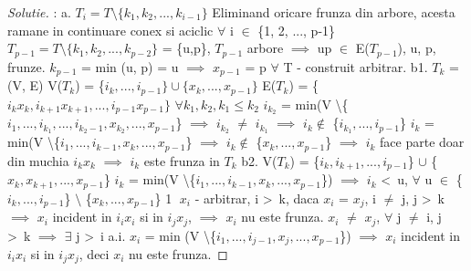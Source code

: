 \documentclass[12pt]{article}
\begin{document}
\begin{proof}[Solutie]:\newline\newline
a.
\newline
$T_i = T \setminus \{k_1, k_2, ..., k_{i-1}\}$
\newline
Eliminand oricare frunza din arbore, acesta ramane in continuare conex si aciclic $\forall$ i $\in$ \{1, 2, ..., p-1\}
\newline
$T_{p-1} = T \setminus \{k_1, k_2, ..., k_{p-2}\}$ = \{u,p\}, $T_{p-1}$ arbore $\implies$ up $\in$ E($T_{p-1}$), u, p, frunze. \newline
$k_{p-1}$ = min (u, p) = u $\implies$ $x_{p-1}$ = p $\forall$ T - construit arbitrar.
\newline\newline
b1.
\newline
$T_k$ = (V, E)
\newline
V($T_k$) = \{$i_k, ..., i_{p-1}\} \cup \{x_k, ..., x_{p-1}\}$
\newline
E($T_k$) = \{$i_k x_k, i_{k+1} x_{k+1}, ..., i_{p-1} x_{p-1}\}$
\newline
$\forall k_1, k_2, k_1 \leq k_2$
\newline
$i_{k_2}$ = min(V \textbackslash \{$i_1, ..., i_{k_1}, ..., i_{k_2 - 1}, x_{k_2}, ..., x_{p-1}$\} $\implies$ $i_{k_2}$ $\neq$ $i_{k_1}$ $\implies$ $i_k \notin$ \{$i_{k_1}, ..., i_{p-1}$\}
\newline
$i_{k}$ = min(V \textbackslash \{$i_1, ..., i_{k-1}, x_{k}, ..., x_{p-1}$\} $\implies$ $i_k \notin$ \{$x_{k}, ..., x_{p-1}$\}
\newline
$\implies$ $i_k$ face parte doar din muchia $i_k x_k$ $\implies$ $i_k$ este frunza in $T_k$
\newline\newline
b2.
\newline
V($T_k$) = \{$i_k, i_{k+1}, ..., i_{p-1}$\} $\cup$ \{$x_k, x_{k+1}, ..., x_{p-1}$\}
\newline
$i_k$ = min(V \textbackslash \{$i_1, ..., i_{k-1}, x_k, ..., x_{p-1}$\}) $\implies$ $i_k$ \textless\ u, $\forall$ u $\in$ \{$i_k, ..., i_{p-1}$\} $\setminus$ \{$x_k, ..., x_{p-1}$\} \textcircled{1}
\newline\newline
$x_i$ - arbitrar, i \textgreater\ k, daca $x_i$ = $x_j$, i $\neq$ j, j \textgreater\ k $\implies$ $x_i$ incident in $i_i x_i$ si in $i_j x_j$, $\implies$ $x_i$ nu este frunza.
\newline
$x_i$ $\neq$ $x_j$, $\forall$ j $\neq$ i, j \textgreater\ k $\implies$ $\exists$ j \textgreater\ i a.i. $x_i$ = min (V \textbackslash \{$i_1, ..., i_{j-1}, x_j, ..., x_{p-1}$\}) $\implies$ $x_i$ incident in $i_i x_i$ si in $i_j x_j$, deci $x_i$ nu este frunza.

\end{proof}
\end{document}
